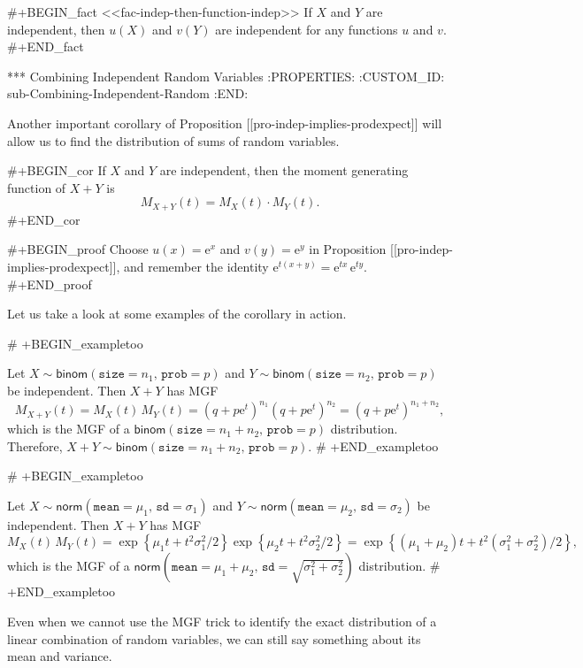 #+BEGIN_fact
<<fac-indep-then-function-indep>> If \(X\) and \(Y\) are independent,
then \(u(X)\) and \(v(Y)\) are independent for any functions \(u\) and
\(v\).
#+END_fact

*** Combining Independent Random Variables
:PROPERTIES:
:CUSTOM_ID: sub-Combining-Independent-Random
:END:

Another important corollary of Proposition
[[pro-indep-implies-prodexpect]] will allow us to find the distribution of
sums of random variables.

#+BEGIN_cor
If \(X\) and \(Y\) are independent, then the moment generating
function of \(X+Y\) is
\begin{equation}
M_{X+Y}(t)=M_{X}(t)\cdot M_{Y}(t).
\end{equation}
#+END_cor

#+BEGIN_proof
Choose \(u(x)=\mathrm{e}^{x}\) and \(v(y)=\mathrm{e}^{y}\) in
Proposition [[pro-indep-implies-prodexpect]], and remember the identity
\(\mathrm{e}^{t(x+y)}=\mathrm{e}^{tx}\,\mathrm{e}^{ty}\).
#+END_proof

Let us take a look at some examples of the corollary in action.

# +BEGIN_exampletoo

Let \(X\sim\mathsf{binom}(\mathtt{size}=n_{1},\,\mathtt{prob}=p)\) and
\(Y\sim\mathsf{binom}(\mathtt{size}=n_{2},\,\mathtt{prob}=p)\) be
independent. Then \(X+Y\) has MGF \[ M_{X+Y}(t)=M_{X}(t)\,
M_{Y}(t)=\left(q+p\mathrm{e}^{t}\right)^{n_{1}}\left(q+p\mathrm{e}^{t}\right)^{n_{2}}=\left(q+p\mathrm{e}^{t}\right)^{n_{1}+n_{2}},
\] which is the MGF of a
\(\mathsf{binom}(\mathtt{size}=n_{1}+n_{2},\,\mathtt{prob}=p)\)
distribution. Therefore,
\(X+Y\sim\mathsf{binom}(\mathtt{size}=n_{1}+n_{2},\,\mathtt{prob}=p)\).
# +END_exampletoo


# +BEGIN_exampletoo

Let
\(X\sim\mathsf{norm}(\mathtt{mean}=\mu_{1},\,\mathtt{sd}=\sigma_{1})\)
and
\(Y\sim\mathsf{norm}(\mathtt{mean}=\mu_{2},\,\mathtt{sd}=\sigma_{2})\)
be independent. Then \(X+Y\) has MGF \[ M_{X}(t)\,
M_{Y}(t)=\exp\left\{ \mu_{1}t+t^{2}\sigma_{1}^{2}/2\right\}
\exp\left\{ \mu_{2}t+t^{2}\sigma_{2}^{2}/2\right\} =\exp\left\{
\left(\mu_{1}+\mu_{2}\right)t+t^{2}\left(\sigma_{1}^{2}+\sigma_{2}^{2}\right)/2\right\}
, \] which is the MGF of a
\(\mathsf{norm}\left(\mathtt{mean}=\mu_{1}+\mu_{2},\,\mathtt{sd}=\sqrt{\sigma_{1}^{2}+\sigma_{2}^{2}}\right)\)
distribution.
# +END_exampletoo


Even when we cannot use the MGF trick to identify the exact
distribution of a linear combination of random variables, we can still
say something about its mean and variance.

